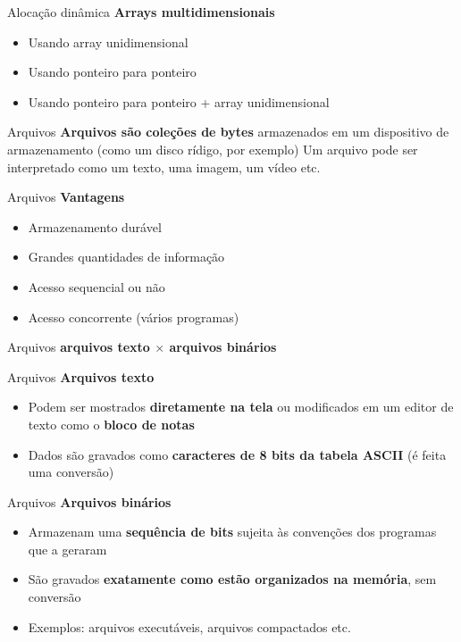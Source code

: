 \documentclass[10pt]{beamer}
\begin{document}
\begin{frame}[fragile]{Alocação dinâmica}
  \huge
  \textbf{Arrays multidimensionais}
  \vfill
  \LARGE
  \begin{itemize}
    \item Usando array unidimensional
    \item Usando ponteiro para ponteiro
    \item Usando ponteiro para ponteiro + array unidimensional
  \end{itemize}
\end{frame}

\begin{frame}{Arquivos}
  \LARGE
  \textbf{Arquivos são coleções de bytes} armazenados em um dispositivo de armazenamento (como um disco rídigo, por exemplo)
  \vfill
  Um arquivo pode ser interpretado como um texto, uma imagem, um vídeo etc.
\end{frame}

\begin{frame}{Arquivos}
  \huge
  \textbf{Vantagens}
  \vfill
  \Large
  \begin{itemize}
    \item Armazenamento durável
    \item Grandes quantidades de informação
    \item Acesso sequencial ou não
    \item Acesso concorrente (vários programas)
  \end{itemize}
\end{frame}

\begin{frame}{Arquivos}
  \LARGE
  \centering
  \textbf{arquivos texto $\times$ arquivos binários}
\end{frame}

\begin{frame}{Arquivos}
  \huge
  \textbf{Arquivos texto}
  \vfill
  \Large
  \begin{itemize}
    \item Podem ser mostrados \textbf{diretamente na tela} ou modificados em um editor de texto como o \textbf{bloco de notas}
    \item Dados são gravados como \textbf{caracteres de 8 bits da tabela ASCII} (é feita uma conversão)
  \end{itemize}
\end{frame}

\begin{frame}{Arquivos}
  \huge
  \textbf{Arquivos binários}
  \vfill
  \Large
  \begin{itemize}
    \item Armazenam uma \textbf{sequência de bits} sujeita às convenções dos programas que a geraram
    \item São gravados \textbf{exatamente como estão organizados na memória}, sem conversão
    \item Exemplos: arquivos executáveis, arquivos compactados etc.
  \end{itemize}
\end{frame}
\end{document}
